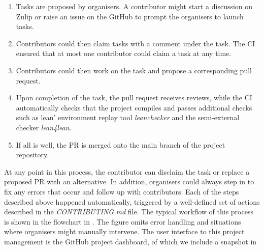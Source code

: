 \begin{enumerate}
    \item Tasks are proposed by organisers. A contributor might start a discussion on Zulip or raise an issue on the GitHub to prompt the organisers to launch tasks.
    \item Contributors could then claim tasks with a comment under the task. The CI ensured that at most one contributor could claim a task at any time.
    \item Contributors could then work on the task and propose a corresponding pull request.
    \item Upon completion of the task, the pull request receives reviews, while the CI automatically checks that the project compiles and passes additional checks such as lean' environment replay tool \emph{leanchecker} and the semi-external checker \emph{lean4lean}\cite{lean4lean}.
    \item If all is well, the PR is merged onto the main branch of the project repository.
\end{enumerate}

At any point in this process, the contributor can disclaim the task or replace a proposed PR with an alternative. In addition, organisers could always step in to fix any errors that occur and follow up with contributors. Each of the steps described above happened automatically, triggered by a well-defined set of actions described in the \emph{CONTRIBUTING.md} file. The typical workflow of this process is shown in the flowchart in . The figure omits error handling and situations where organisers might manually intervene. The user interface to this project management is the GitHub project dashboard, of which we include a snapshot in 

